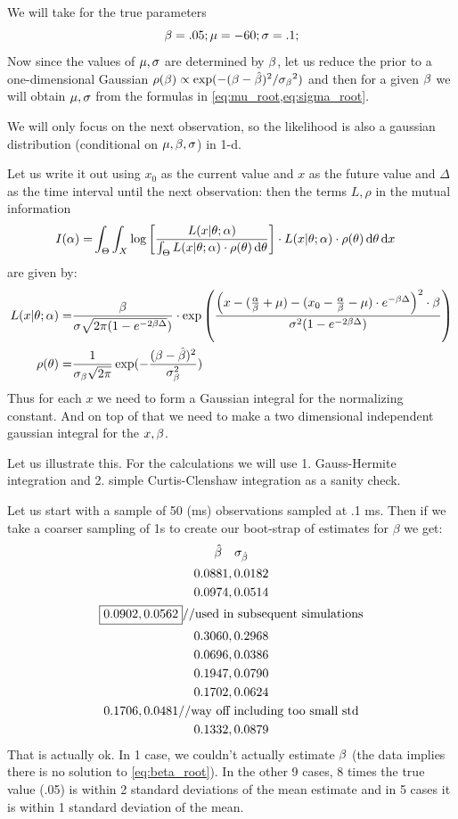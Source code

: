 \documentclass{article}
\begin{document}
We will take for the true parameters
$$
{\beta} = .05; {\mu } = -60; {\sigma } = .1;
$$
Now since the values of ${\mu }, {\sigma }$ are determined by ${\beta}$, let us reduce the prior
to a one-dimensional Gaussian
$\rho({\beta}) \propto \exp( -({\beta} -\hat {{\beta}})^2 / {{\sigma }_{\beta}}^2) $
and then for a given ${\beta}$ we will obtain ${\mu }, {\sigma }$ from
the formulas in \cref{eq:mu_root,eq:sigma_root}.

We will only focus on the next observation, so the likelihood is also a gaussian
distribution (conditional on ${\mu },{\beta},{\sigma }$) in 1-d. 

Let us write it out using $x_0$ as the current value and $x$ as the future
value and $\Delta$ as the time interval until the next observation:
then the terms $L,\rho$ in the mutual information
\begin{align*}
I({\alpha}) =& \int_\Theta \int_X  \log\left[\frac{L(x|{\theta}; {\alpha})}
										{\int_\Theta L(x|{\theta};{\alpha})\cdot \rho({\theta}) \, \mathrm{d} {\theta}} \right] \cdot L(x|
										{\theta};{\alpha}) \cdot \rho({\theta}) \, \mathrm{d} {\theta} \, \mathrm{d} x
										\end{align*}
										are given by:
\begin{align*}
L(x|{\theta}; {\alpha}) =& \frac{{\beta}}{{\sigma } \sqrt{2\pi(1 -  e^{-2{\beta} \Delta}})}
 	\cdot \exp\left(\frac{\left( x - (\frac {{\alpha}}{{\beta}} + \mu)  - (x_{0} - \frac {{\alpha}}{{\beta}}
 	- \mu) \cdot e^{-{\beta} \Delta} \right)^2 \cdot {\beta}} { {\sigma }^2  (1-e^{-2{\beta}\Delta})}
 	\right) 
 	\\
 	\rho({\theta}) =&  
 	\frac{1}{{\sigma }_{\beta} \sqrt{2\pi} } \exp(-\frac{({\beta}-\hat{{\beta}})^2}{{\sigma }_{\beta}^2}) 
		\end{align*}
Thus for each $x$ we need to form a Gaussian integral for the normalizing
constant. And on top of that we need to make a two dimensional independent
gaussian integral for the $x,{\beta}$.

Let us illustrate this. For the calculations we will use 1. Gauss-Hermite
integration and 2. simple Curtis-Clenshaw integration as a sanity check. 

Let us start with a sample of 50 (ms) observations sampled at .1 ms. Then if we
take a coarser sampling of 1s to create our boot-strap of estimates for $\beta$
we get:
\begin{equation*}
\begin{gathered}
\hat \beta \quad {\sigma }_{\hat{{\beta}}} \\
0.0881, 0.0182\\
0.0974, 0.0514\\
\boxed{0.0902, 0.0562} // \textrm{used in subsequent simulations}\\
0.3060, 0.2968\\
0.0696, 0.0386\\
0.1947, 0.0790\\
0.1702, 0.0624\\
0.1706, 0.0481  // \textrm{way off including too small std}\\
 0.1332, 0.0879\\
\end{gathered}
\end{equation*}
That is actually ok. In 1 case, we couldn't actually estimate ${\beta}$ (the data
implies there is no solution to \cref{eq:beta_root}). In the other 9 cases, 8
times the true value (.05) is within 2 standard deviations of the mean estimate
and in 5 cases it is within 1 standard deviation of the mean.
\end{document}
